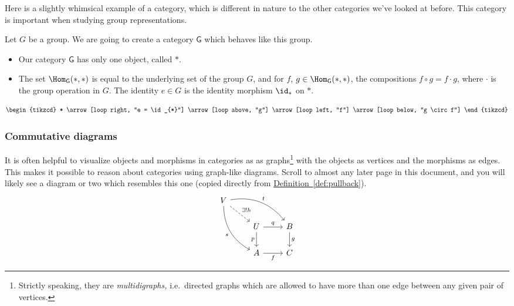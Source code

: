 \documentclass[notes.tex]{subfiles}
\begin{document}
\begin{example}
  \label{eg:groupsaregroupoidswithoneobject}
  Here is a slightly whimsical example of a category, which is different in nature to the other categories we've looked at before. This category is important when studying group representations.

  Let $G$ be a group. We are going to create a category $\mathsf{G}$ which behaves like this group.
  \begin{itemize}
    \item Our category $\mathsf{G}$ has only one object, called $*$.

    \item The set $\Hom_{\mathsf{G}}(*, *)$ is equal to the underlying set of the group $G$, and for $f$, $g \in \Hom_{\mathsf{G}}(*, *)$, the compositions $f \circ g = f\cdot g$, where $\cdot$ is the group operation in $G$. The identity $e \in G$ is the identity morphism $\id_{*}$ on $*$.
  \end{itemize}
  \begin{equation*}
    \begin{tikzcd}
      *
      \arrow[loop right, "e = \id_{*}"]
      \arrow[loop above, "g"]
      \arrow[loop left, "f"]
      \arrow[loop below, "g \circ f"]
    \end{tikzcd}
  \end{equation*}
\end{example}


\subsubsection{Commutative diagrams}\label{sss:commutative_diagrams}

It is often helpful to visualize objects and morphisms in categories as as graphs\footnote{Strictly speaking, they are \emph{multidigraphs,} i.e.\ directed graphs which are allowed to have more than one edge between any given pair of vertices.} with the objects as vertices and the morphisms as edges. This makes it possible to reason about categories using graph-like diagrams. Scroll to almost any later page in this document, and you will likely see a diagram or two which resembles this one (copied directly from \hyperref[def:pullback]{Definition~\ref*{def:pullback}}).
\begin{equation*}
  \begin{tikzcd}
    V \arrow[rrd, bend left, "t"] \arrow[rd, dashed, "\exists!h"] \arrow[rdd, bend right, swap, "s"] &   &  \\
    & U \arrow[r, "q"] \arrow[d, swap, "p"] & B \arrow[d, "g"] \\
    & A \arrow[r, swap, "f"] & C
  \end{tikzcd}
\end{equation*}
\end{document}
